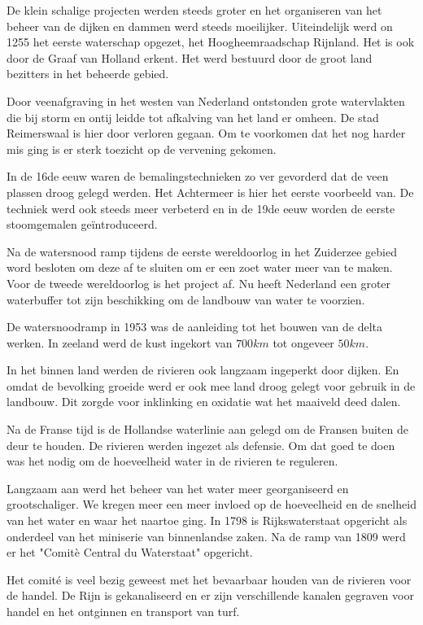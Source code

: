 De klein schalige projecten werden steeds groter en het organiseren van het beheer van de dijken en dammen werd steeds moeilijker.
Uiteindelijk werd on 1255 het eerste waterschap opgezet, het Hoogheemraadschap Rijnland.
Het is ook door de Graaf van Holland erkent.
Het werd bestuurd door de groot land bezitters in het beheerde gebied.

Door veenafgraving in het westen van Nederland ontstonden grote watervlakten die bij storm en ontij leidde tot afkalving van het land er omheen.
De stad Reimerswaal is hier door verloren gegaan.
Om te voorkomen dat het nog harder mis ging is er sterk toezicht op de vervening gekomen.

In de 16de eeuw waren de bemalingstechnieken zo ver gevorderd dat de veen plassen droog gelegd werden.
Het Achtermeer is hier het eerste voorbeeld van.
De techniek werd ook steeds meer verbeterd en in de 19de eeuw worden de eerste stoomgemalen geïntroduceerd.

Na de watersnood ramp tijdens de eerste wereldoorlog in het Zuiderzee gebied word besloten om deze af te sluiten om er een zoet water meer van te maken.
Voor de tweede wereldoorlog is het project af.
Nu heeft Nederland een groter waterbuffer tot zijn beschikking om de landbouw van water te voorzien.

De watersnoodramp in 1953 was de aanleiding tot het bouwen van de delta werken.
In zeeland werd de kust ingekort van $700 km$ tot ongeveer $50 km$.

In het binnen land werden de rivieren ook langzaam ingeperkt door dijken.
En omdat de bevolking groeide werd er ook mee land droog gelegt voor gebruik in de landbouw.
Dit zorgde voor inklinking en oxidatie wat het maaiveld deed dalen.

Na de Franse tijd is de Hollandse waterlinie aan gelegd om de Fransen buiten de deur te houden.
De rivieren werden ingezet als defensie.
Om dat goed te doen was het nodig om de hoeveelheid water in de rivieren te reguleren.

Langzaam aan werd het beheer van het water meer georganiseerd en grootschaliger.
We kregen meer een meer invloed op de hoeveelheid en de snelheid van het water en waar het naartoe ging.
In 1798 is Rijkswaterstaat opgericht als onderdeel van het miniserie van binnenlandse zaken.
Na de ramp van 1809 werd er het "Comit\`e Central du Waterstaat" opgericht.

Het comité is veel bezig geweest met het bevaarbaar houden van de rivieren voor de handel.
De Rijn is gekanaliseerd en er zijn verschillende kanalen gegraven voor handel en het ontginnen en transport van turf.

